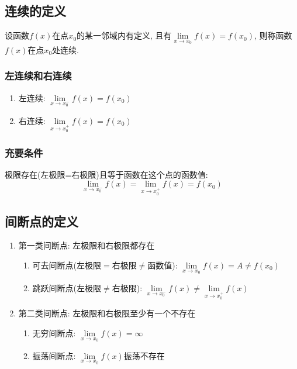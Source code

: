 \subsection{连续的定义}
设函数$ f(x) $在点$ x_{0} $的某一邻域内有定义, 且有$ \lim\limits_{x\rightarrow x_{0}}f(x)=f(x_{0}) $, 则称函数$ f(x) $在点$ x_{0} $处连续.
\subsubsection{左连续和右连续}
\begin{enumerate}
    \item 左连续: $ \lim\limits_{x \rightarrow x_{0}^{-}}f(x)=f(x_{0}) $
    \item 右连续: $ \lim\limits_{x \rightarrow x_{0}^{+}}f(x)=f(x_{0}) $
\end{enumerate}
\subsubsection{充要条件}
极限存在(左极限=右极限)且等于函数在这个点的函数值:
\begin{equation*}
    \lim\limits_{x \rightarrow x_{0}^{-}}f(x)=\lim\limits_{x \rightarrow x_{0}^{+}}f(x)=f(x_{0})
\end{equation*}
\subsection{间断点的定义}
\begin{enumerate}
    \item 第一类间断点: 左极限和右极限都存在
          \begin{enumerate}
              \item 可去间断点(左极限$ = $右极限$ \neq $函数值): $ \lim\limits_{x\rightarrow x_{0}}f(x)=A\neq f(x_{0}) $
              \item 跳跃间断点(左极限$ \neq $右极限): $ \lim\limits_{x\rightarrow x_{0}^{-}}f(x) \neq \lim\limits_{x\rightarrow x_{0}^{+}}f(x) $
          \end{enumerate}
    \item 第二类间断点: 左极限和右极限至少有一个不存在
          \begin{enumerate}
              \item 无穷间断点: $ \lim\limits_{x\rightarrow x_{0}}f(x)=\infty $
              \item 振荡间断点: $ \lim\limits_{x\rightarrow x_{0}}f(x) $振荡不存在
          \end{enumerate}
\end{enumerate}
